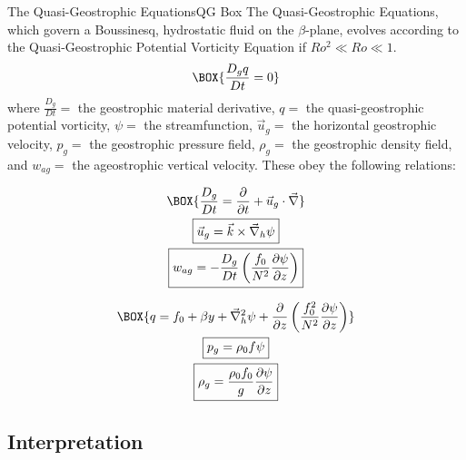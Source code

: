 \begin{fact}{The Quasi-Geostrophic Equations}{QG Box}\label{QG Box}
    The Quasi-Geostrophic Equations, which govern a Boussinesq, hydrostatic fluid on the $\beta$-plane, evolves according to the Quasi-Geostrophic Potential Vorticity Equation if $Ro^2\ll Ro \ll 1$.
    \begin{gather}
        \label{QGPV Cons}
        \BOX{
            \frac{D_g q}{Dt} = 0
        }
    \end{gather}
    where $\frac{D_g}{Dt}=$ the geostrophic material derivative, $q=$ the quasi-geostrophic potential vorticity, $\psi=$ the streamfunction, $\vec{u}_g=$ the horizontal geostrophic velocity, $p_g=$ the geostrophic pressure field, $\rho_g=$ the geostrophic density field, and $w_{ag}=$ the ageostrophic vertical velocity. These obey the following relations:

    \begin{minipage}{0.42\linewidth}
        \begin{gather}
            \label{Geostrophic MD}
            \BOX{
                \frac{D_g}{Dt}=\frac{\partial }{\partial t}+ \vec{u}_g\cdot\vec{\nabla}
            }
            \\
            \label{Streamfct}
            \boxed{\vec{u}_g = \vec{k}\times\vec{\nabla}_h\psi}
            \\
            \label{wag}
            \boxed{w_{ag}=-\frac{D_g}{Dt}\left( \frac{f_0}{N^2} \frac{\partial \psi}{\partial z}\right)}
        \end{gather}
    \end{minipage}
    \hfill
    \begin{minipage}{0.56\linewidth}
        \begin{gather}
            \label{QGPV}
            \BOX{
                q=f_0+\beta y + \vec{\nabla}_h^2 \psi + \frac{\partial }{\partial z}\left( \frac{f_0^2}{N^2} \frac{\partial \psi}{\partial z} \right)
            }
            \\
            \label{p QGPV}
            \boxed{p_g = \rho_0 f \psi}
            \\
            \label{rho QGPV}
            \boxed{\rho_g = \frac{\rho_0 f_0}{g}\frac{\partial \psi}{\partial z}}
        \end{gather}
    \end{minipage}

\end{fact}

\subsection{Interpretation}

